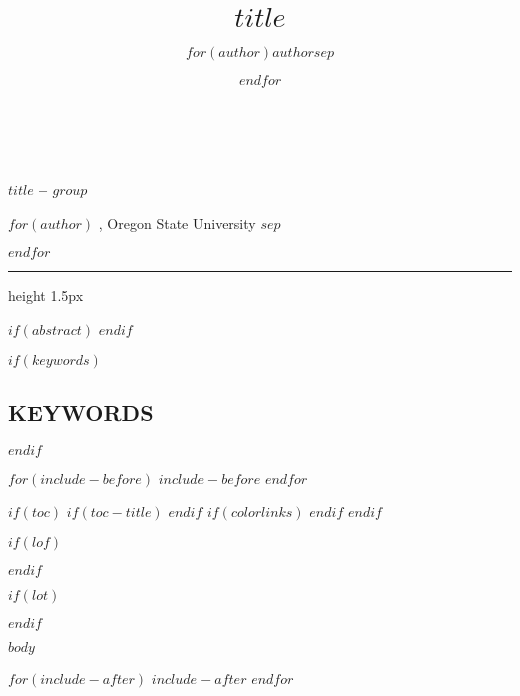 \documentclass[10pt]{article}
\title{$title$}
\author{$for(author)$$author$$sep$ \and $endfor$}
\date{}
\begin{document}
\thispagestyle{plain}


\textbf{ \\ \\
  \LARGE $title$ -- $group$
}

\vspace{2em}

{
  \setlength{\parskip}{0.5em}
  $for(author)$
  , Oregon State University
  $sep$

  $endfor$
}

\vspace{2em}
\hrule height 1.5px
\vspace{1em}

$if(abstract)$
$endif$

$if(keywords)$
\hypertarget{keywords}{%
\subsection{\normalsize KEYWORDS}\label{keywords}}

$endif$

$for(include-before)$
$include-before$
$endfor$

$if(toc)$
$if(toc-title)$
\renewcommand*\contentsname{$toc-title$}
$endif$
{
$if(colorlinks)$
\hypersetup{linkcolor=$if(toccolor)$$toccolor$$else$$endif$}
$endif$
\setcounter{tocdepth}{$toc-depth$}
\tableofcontents
}
$endif$

$if(lof)$
\listoffigures
$endif$

$if(lot)$
\listoftables
$endif$

$body$

$for(include-after)$
$include-after$
$endfor$
\end{document}
